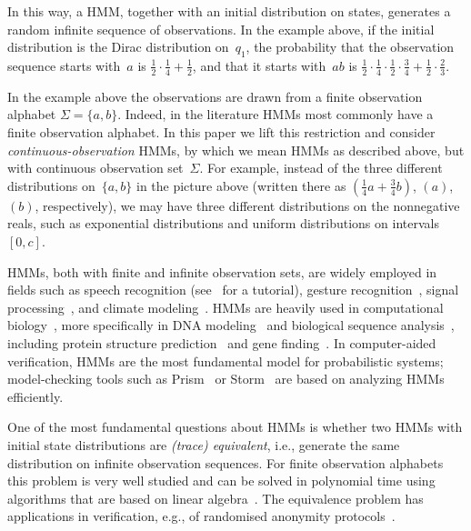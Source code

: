 \documentclass[a4paper,UKenglish,cleveref, autoref,mathscr]{lipics-v2019}
\newcommand{\1}{\mathbbm{1}}
\begin{document}
In this way, a HMM, together with an initial distribution on states, generates a random infinite sequence of observations.
In the example above, if the initial distribution is the Dirac distribution on~$q_1$, the probability that the observation sequence starts with~$a$ is $\frac12 \cdot \frac14 + \frac12$, and that it starts with~$a b$ is $\frac12 \cdot \frac14 \cdot \frac12 \cdot \frac34 + \frac12 \cdot \frac23$.

In the example above the observations are drawn from a finite observation alphabet $\Sigma = \{a,b\}$.
Indeed, in the literature HMMs most commonly have a finite observation alphabet.
In this paper we lift this restriction and consider \emph{continuous-observation} HMMs, by which we mean HMMs as described above, but with continuous observation set~$\Sigma$.
For example, instead of the three different distributions on~$\{a,b\}$ in the picture above (written there as $(\frac14 a + \frac34 b)$, $(a)$, $(b)$, respectively), we may have three different distributions on the nonnegative reals, such as exponential distributions and uniform distributions on intervals~$[0,c]$.

HMMs, both with finite and infinite observation sets, are widely employed in fields such as speech recognition (see~\cite{Rabiner89} for a tutorial),
gesture recognition~\cite{Gesture},
signal processing~\cite{SignalProcessing},
and climate modeling~\cite{Weather}.
HMMs are heavily used in computational biology~\cite{HMM-comp-biology},
more specifically in DNA modeling~\cite{DNA-modeling} and biological sequence analysis~\cite{durbin1998biological},
including protein structure prediction~\cite{ProteinStructure} %
and gene finding~\cite{GeneFinding}.
In computer-aided verification, HMMs are the most fundamental model for probabilistic systems; model-checking tools such as Prism~\cite{KNP11} or Storm~\cite{Storm} are based on analyzing HMMs efficiently.

One of the most fundamental questions about HMMs is whether two HMMs with initial state distributions are \emph{(trace) equivalent}, i.e., generate the same distribution on infinite observation sequences.
For finite observation alphabets this problem is very well studied and can be solved in polynomial time using algorithms that are based on linear algebra~\cite{schut61,Paz71,Tzeng92,CortesMRdistance}.
The equivalence problem has applications in verification, e.g., of randomised anonymity protocols~\cite{kief11}.
\end{document}
